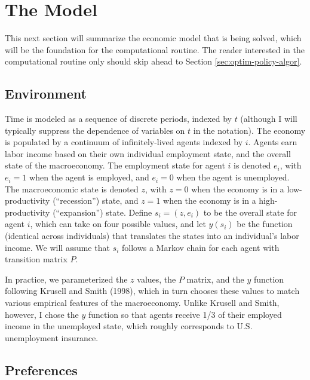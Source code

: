\documentclass[a4paper,12pt]{article}
\numberwithin{equation}{section}
\theoremstyle{definition}
\begin{document}
\section{The Model}
\label{sec:model}

This next section will summarize the economic model that is being
solved, which will be the foundation for the computational
routine. The reader interested in the computational routine only
should skip ahead to Section \ref{sec:optim-policy-algor}.

\subsection{Environment}

Time is modeled as a sequence of discrete periods, indexed by $t$
(although I will typically suppress the dependence of variables on $t$
in the notation). The economy is populated by a continuum of
infinitely-lived agents indexed by $i$. Agents earn labor income based
on their own individual employment state, and the overall state of the
macroeconomy. The employment state for agent $i$ is denoted $e_i$,
with $e_i = 1$ when the agent is employed, and $e_i = 0$ when the
agent is unemployed. The macroeconomic state is denoted $z$, with $z =
0$ when the economy is in a low-productivity (``recession'') state,
and $z = 1$ when the economy is in a high-productivity (``expansion'')
state. Define $s_i = (z, e_i)$ to be the overall state for agent $i$,
which can take on four possible values, and let $y(s_i)$ be the
function (identical across individuals) that translates the states
into an individual's labor income. We will assume that $s_i$ follows a
Markov chain for each agent with transition matrix $P$.

In practice, we parameterized the $z$ values, the $P$ matrix, and
the $y$ function following Krusell and Smith (1998), which in turn
chooses these values to match various empirical features of the
macroeconomy. Unlike Krusell and Smith, however, I chose the $y$
function so that agents receive 1/3 of their employed income in the
unemployed state, which roughly corresponds to U.S. unemployment
insurance.

\subsection{Preferences}
\end{document}
